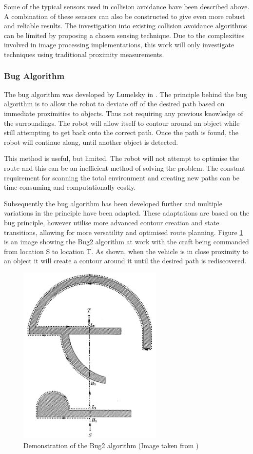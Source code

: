 	Some of the typical sensors used in collision avoidance have been described above. A combination of these sensors can also be constructed to give even more robust and reliable results. The investigation into existing collision avoidance algorithms can be limited by proposing a chosen sensing technique. Due to the complexities involved in image processing implementations, this work will only investigate techniques using traditional proximity measurements.
	
		\subsubsection{Bug Algorithm}
		The bug algorithm was developed by Lumelsky in \cite{Lumelsky1990}. The principle behind the bug algorithm is to allow the robot to deviate off of the desired path based on immediate proximities to objects. Thus not requiring any previous knowledge of the surroundings. The robot will allow itself to contour around an object while still attempting to get back onto the correct path. Once the path is found, the robot will continue along, until another object is detected.
		
		This method is useful, but limited. The robot will not attempt to optimise the route and this can be an inefficient method of solving the problem. The constant requirement for scanning the total environment and creating new paths can be time consuming and computationally costly.
		
		Subsequently the bug algorithm has been developed further and multiple variations in the principle have been adapted. These adaptations are based on the bug principle, however utilise more advanced contour creation and state transitions, allowing for more versatility and optimised route planning. Figure \ref{IM_Bug2} is an image showing the Bug2 algorithm at work with the craft being commanded from location S to location T. As shown, when the vehicle is in close proximity to an object it will create a contour around it until the desired path is rediscovered.
		
		\begin{figure}[H]
			\centering
			\includegraphics[height = 9cm]{Images/Bug2}     
			\caption{Demonstration of the Bug2 algorithm (Image taken from \cite{Lumelsky1990})}
			\label{IM_Bug2}
		\end{figure}
		
